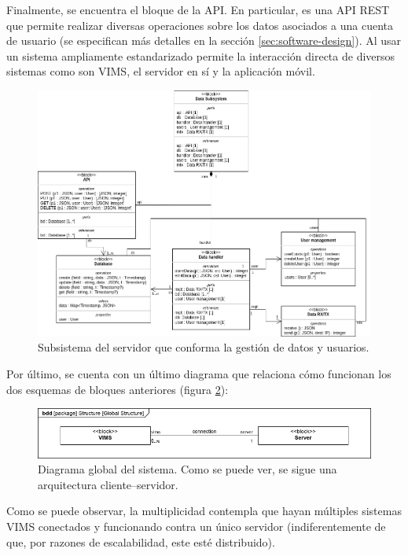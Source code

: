 Finalmente, se encuentra el bloque de la \ac{API}. En particular, es una \ac{API} \ac{REST}
que permite realizar diversas operaciones sobre los datos asociados a una cuenta de
usuario (se especifican más detalles en la sección \ref{sec:software-design}). Al usar
un sistema ampliamente estandarizado permite la interacción directa de diversos
sistemas como son \ac{VIMS}, el servidor en sí y la aplicación móvil.

\begin{figure}[H]
  \centering
  \includegraphics[width=\linewidth]{images/BD-data.png}
  \caption{Subsistema del servidor que conforma la gestión de datos y usuarios.}
  \label{fig:bd-data}
\end{figure}

Por último, se cuenta con un último diagrama que relaciona cómo funcionan los dos
esquemas de bloques anteriores (figura \ref{bd:global}):

\begin{figure}[H]
  \centering
  \includegraphics[width=\linewidth]{images/BlockDiagrams-Global.drawio.png}
  \caption{Diagrama global del sistema. Como se puede ver, se sigue una arquitectura cliente--servidor.}
  \label{bd:global}
\end{figure}

Como se puede observar, la multiplicidad contempla que hayan múltiples sistemas
\ac{VIMS} conectados y funcionando contra un único servidor (indiferentemente de
que, por razones de escalabilidad, este esté distribuido).
